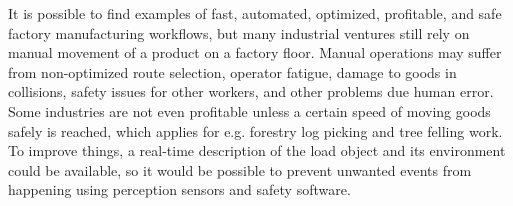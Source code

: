 \documentclass[12pt,a4paper,oneside,pdftex]{report}
\begin{document}



It is possible to find examples of fast, automated, optimized, profitable, and safe factory manufacturing workflows, but many industrial ventures still rely on manual movement of a product on a factory floor. Manual operations may suffer from non-optimized route selection, operator fatigue, damage to goods in collisions, safety issues for other workers, and other problems due human error. Some industries are not even profitable unless a certain speed of moving goods safely is reached, which applies for e.g. forestry log picking and tree felling work. To improve things, a real-time description of the load object and its environment could be available, so it would be possible to prevent unwanted events from happening using perception sensors and safety software. \citep{Kappi13}
\end{document}
